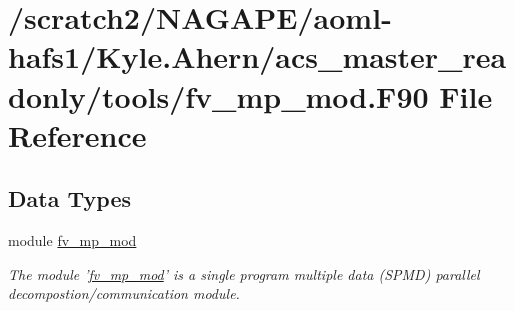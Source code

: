 \section{/scratch2/\-N\-A\-G\-A\-P\-E/aoml-\/hafs1/\-Kyle.Ahern/acs\-\_\-master\-\_\-readonly/tools/fv\-\_\-mp\-\_\-mod.F90 File Reference}
\label{fv__mp__mod_8F90}
\subsection*{Data Types}
\begin{DoxyCompactItemize}
\item 
module \hyperlink{classfv__mp__mod}{fv\-\_\-mp\-\_\-mod}
\begin{DoxyCompactList}\small\item\em The module '\hyperlink{classfv__mp__mod}{fv\-\_\-mp\-\_\-mod}' is a single program multiple data (S\-P\-M\-D) parallel decompostion/communication module. \end{DoxyCompactList}\end{DoxyCompactItemize}
